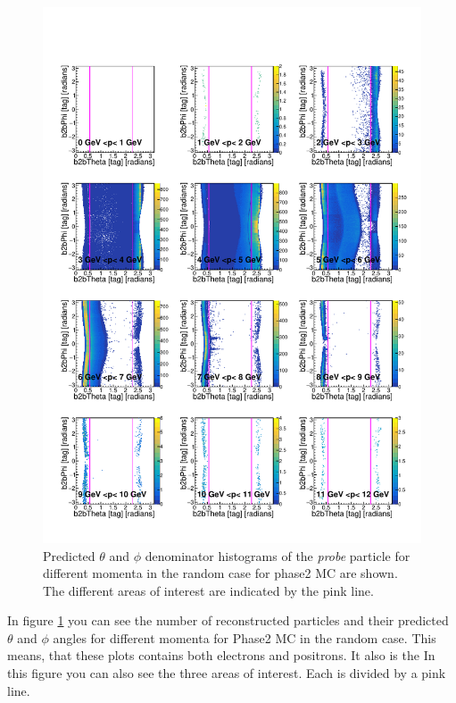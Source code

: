 \documentclass[a4paper,11pt,twosided,final,german,openbib,pdftex,listof=totoc,bibliography=totoc]{scrbook}
\begin{document}
\begin{figure}[h!]
	\includegraphics[width=\textwidth]{Plots/RTPMRandomD_MC.pdf}
	\caption{Predicted $\theta$ and $\phi$ denominator histograms of the \textit{probe} particle for different momenta in the random case for phase2 MC are shown. The different areas of interest are indicated by the pink line.}
	\label{plt:RTPMRandomD_MC}
\end{figure}

In figure \ref{plt:RTPMRandomD_MC} you can see the number of reconstructed particles and their predicted $\theta$ and $\phi$ angles for different momenta for Phase2 MC in the random case. This means, that these plots contains both electrons and positrons. It also is the  In this figure you can also see the three areas of interest. Each is divided by a pink line.
\end{document}
